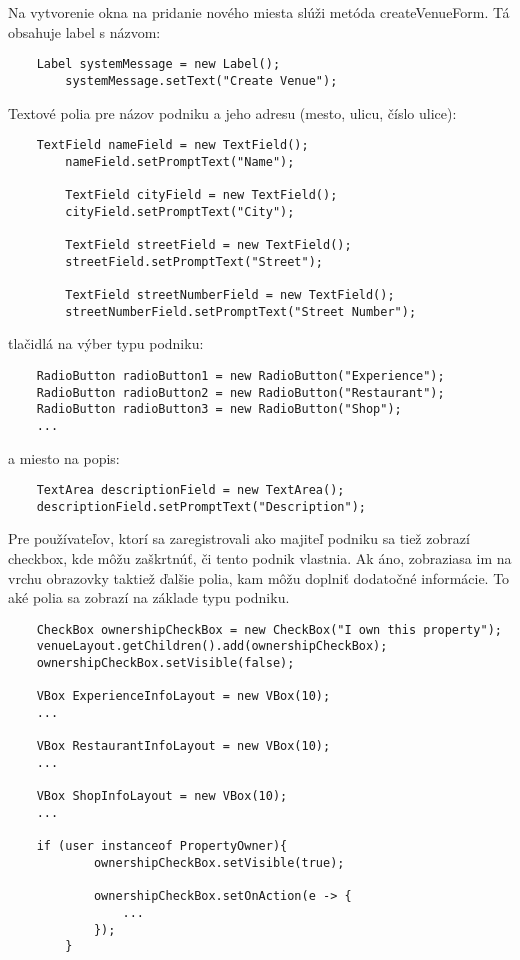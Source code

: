 \documentclass{article}
\begin{document}
Na vytvorenie okna na pridanie nového miesta slúži metóda createVenueForm. 
Tá obsahuje label s názvom:
\begin{verbatim}
    Label systemMessage = new Label();
        systemMessage.setText("Create Venue");
\end{verbatim}
Textové polia pre názov podniku a jeho adresu (mesto, ulicu, číslo ulice):
\begin{verbatim}
    TextField nameField = new TextField();
        nameField.setPromptText("Name");

        TextField cityField = new TextField();
        cityField.setPromptText("City");

        TextField streetField = new TextField();
        streetField.setPromptText("Street");

        TextField streetNumberField = new TextField();
        streetNumberField.setPromptText("Street Number");
\end{verbatim}
tlačidlá na výber typu podniku:
\begin{verbatim}
    RadioButton radioButton1 = new RadioButton("Experience");
    RadioButton radioButton2 = new RadioButton("Restaurant");
    RadioButton radioButton3 = new RadioButton("Shop");
    ...
\end{verbatim}
a miesto na popis:
\begin{verbatim}
    TextArea descriptionField = new TextArea();
    descriptionField.setPromptText("Description");
\end{verbatim}

Pre používateľov, ktorí sa zaregistrovali ako majiteľ podniku sa tiež zobrazí checkbox, kde môžu zaškrtnúť, či tento podnik vlastnia. Ak áno, zobraziasa im na vrchu obrazovky taktiež ďalšie polia, kam môžu doplniť dodatočné informácie. To aké polia sa zobrazí na základe typu podniku.
\begin{verbatim}
    CheckBox ownershipCheckBox = new CheckBox("I own this property");
    venueLayout.getChildren().add(ownershipCheckBox);
    ownershipCheckBox.setVisible(false);

    VBox ExperienceInfoLayout = new VBox(10);
    ...

    VBox RestaurantInfoLayout = new VBox(10);
    ...

    VBox ShopInfoLayout = new VBox(10);
    ...

    if (user instanceof PropertyOwner){
            ownershipCheckBox.setVisible(true);

            ownershipCheckBox.setOnAction(e -> {
                ...
            });
        }
\end{verbatim}
\end{document}

